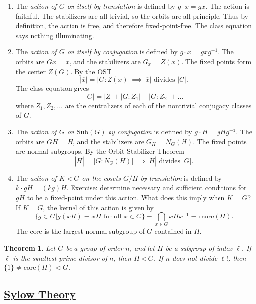\documentclass[11pt]{amsart}
\newtheorem*{theorem*}{Theorem}
\theoremstyle{definition}
\renewcommand\:{\colon}
\renewcommand\bar[1]{\overline{#1}}
\newcommand{\1}{\mathds{1}}
\newcommand{\core}{\text{core}}
\newcommand{\Sub}{\text{Sub}}
\begin{document}
\begin{enumerate}[leftmargin=22.5pt]\setlength\itemsep{0em}
	\item The \textit{action of $G$ on itself by translation} is defined by $g\cdot x = gx$. The action is faithful. The stabilizers are all trivial, so the orbits are all principle. Thus by definition, the action is free, and therefore fixed-point-free. The class equation says nothing illuminating.
	\item The \textit{action of $G$ on itself by conjugation} is defined by $g \cdot x = gxg^{-1}$. The orbits are $Gx = \bar{x}$, and the stabilizers are $G_x = Z(x)$. The fixed points form the center $Z(G)$. By the OST \[ |\bar{x}| = |G : Z(x)| \implies |\bar{x}| \text{ divides } |G|. \] The class equation gives \[ |G| = |Z| + |G:Z_1| + |G:Z_2| + \dots \] where $Z_1, Z_2, \dots$ are the centralizers of each of the nontrivial conjugacy classes of $G$.
	\item The \textit{action of $G$ on $\Sub(G)$ by conjugation} is defined by $g \cdot H = gHg^{-1}$. The orbits are $GH = \bar{H}$, and the stabilizers are $G_H = N_G(H)$. The fixed points are normal subgroups. By the Orbit Stabilizer Theorem 
		\[ |\bar{H}| = |G : N_G(H)| \implies |\bar{H}| \text{ divides } |G|. \]
	\item The \textit{action of $K < G$ on the cosets $G/H$ by translation} is defined by $k \cdot gH = (kg)H$. Exercise: determine necessary and sufficient conditions for $gH$ to be a fixed-point under this action. What does this imply when $K = G$?
	If $K = G$, the kernel of this action is given by
		\[ \{g \in G | g(xH) = xH \text{ for all } x \in G \} = \bigcap_{x \in G} xHx^{-1} =: \core(H). \]
	The core is the largest normal subgroup of $G$ contained in $H$.
\end{enumerate}

\begin{theorem*}
	Let $G$ be a group of order $n$, and let $H$ be a subgroup of index $\ell$. If $\ell$ is the smallest prime divisor of $n$, then $H \triangleleft G$. If $n$ does not divide $\ell!$, then $\{1\} \neq \core(H) \triangleleft G$.
\end{theorem*}

\vskip20pt



\subsection*{\underline{Sylow Theory}}
\end{document}
